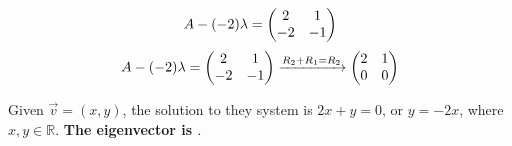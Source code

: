 \documentclass{article}
\begin{document}
{{		\[
		A-(-2)\lambda = 
			\left(\begin{array}{@{}cc@{}}
			2  &  1 \\
			-2 & -1 \\
		\end{array}\right) 
		\]
		\[
		A-(-2)\lambda = 
		\left(\begin{array}{@{}cc@{}}
			2  &  1 \\
			-2 & -1 \\
		\end{array}\right) \xrightarrow[]{R_2 + R_1 = R_2}
		\left(\begin{array}{@{}cc@{}}
			2  &  1 \\
			0 & 0 \\
		\end{array}\right)
		\]
		\par\noindent Given \( \vec v = (x,y)\), the solution to they system is \(2x + y =0\), or \(y = -2x\), where \(x,y \in \mathbb{R}\). \textbf{The eigenvector is \(<1,-2>\)}.
	}}
\end{document}
